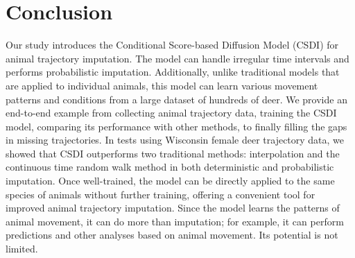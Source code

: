 \documentclass[11pt]{article}
\begin{document}
\section{Conclusion}
Our study introduces the Conditional Score-based Diffusion Model (CSDI) for animal trajectory imputation. The model can handle irregular time intervals and performs probabilistic imputation. Additionally, unlike traditional models that are applied to individual animals, this model can learn various movement patterns and conditions from a large dataset of hundreds of deer. We provide an end-to-end example from collecting animal trajectory data, training the CSDI model, comparing its performance with other methods, to finally filling the gaps in missing trajectories. In tests using Wisconsin female deer trajectory data, we showed that CSDI outperforms two traditional methods: interpolation and the continuous time random walk method in both deterministic and probabilistic imputation. Once well-trained, the model can be directly applied to the same species of animals without further training, offering a convenient tool for improved animal trajectory imputation. Since the model learns the patterns of animal movement, it can do more than imputation; for example, it can perform predictions and other analyses based on animal movement. Its potential is not limited.




\appendix
\end{document}
